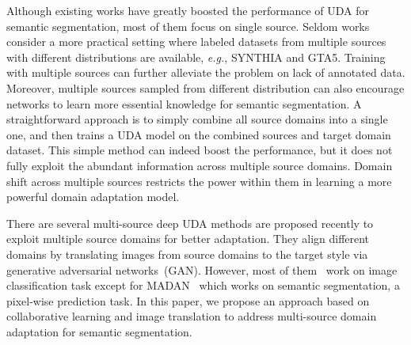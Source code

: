 \documentclass[final]{cvpr}
\def\eg{\textit{e.g.}}
\begin{document}
Although existing works have greatly boosted the performance of UDA for semantic segmentation, most of them focus on single source. Seldom works consider a more practical setting where labeled datasets from multiple sources with different distributions are available, \eg, SYNTHIA and GTA5. Training with multiple sources can further alleviate the problem on lack of annotated data. Moreover, multiple sources sampled from different distribution can also encourage networks to learn more essential knowledge for semantic segmentation. A straightforward approach is to simply combine all source domains into a single one, and then trains a UDA model on the combined sources and target domain dataset. This simple method can indeed boost the performance, but it does not fully exploit the abundant information across multiple source domains. Domain shift across multiple sources restricts the power within them in learning a more powerful domain adaptation model.

There are several multi-source deep UDA methods are proposed recently to exploit multiple source domains for better adaptation. 
They align different domains by translating images from source domains to the target style via generative adversarial networks~(GAN). However, most of them~\cite{Peng_2019_ICCV, sun2011two, liu2016structure} work on image classification task except for MADAN~\cite{zhao2019multi} which works on semantic segmentation, a pixel-wise prediction task.
In this paper, we propose an approach based on collaborative learning and image translation to address multi-source domain adaptation for semantic segmentation. 
\end{document}

